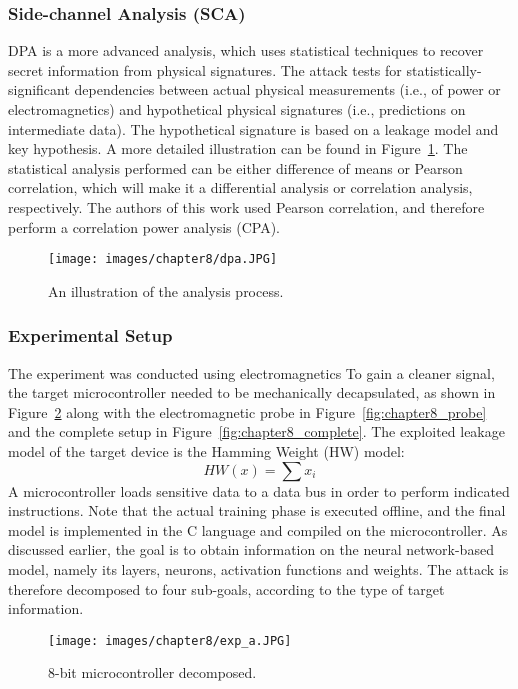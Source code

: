 \subsubsection{Side-channel Analysis (SCA)}
DPA is a more advanced analysis, which uses statistical techniques to recover secret information from physical signatures.
The attack tests for statistically-significant dependencies between actual physical measurements (i.e., of power or electromagnetics) and hypothetical physical signatures (i.e., predictions on intermediate data).
The hypothetical signature is based on a leakage model and key hypothesis. A more detailed illustration can be found in Figure~\ref{fig:chapter8_dpa}.
The statistical analysis performed can be either difference of means or Pearson correlation, which will make it a differential analysis or correlation analysis, respectively.
The authors of this work used Pearson correlation, and therefore perform a correlation power analysis (CPA).

\begin{figure}
    \centering
    \texttt{[image: images/chapter8/dpa.JPG]}
    \caption{An illustration of the analysis process.}
    \label{fig:chapter8_dpa}
\end{figure}

\subsubsection{Experimental Setup}
The experiment was conducted using electromagnetics 
To gain a cleaner signal, the target microcontroller needed to be mechanically decapsulated, as shown in Figure~\ref{fig:chapter8_mc} along with the electromagnetic probe in Figure~\ref{fig:chapter8_probe} and the complete setup in Figure~\ref{fig:chapter8_complete}.
The exploited leakage model of the target device is the Hamming Weight (HW) model:
$$HW(x) = \sum{x_i}$$
A microcontroller loads sensitive data to a data bus in order to perform indicated instructions.
Note that the actual training phase is executed offline, and the final model is implemented in the C language and compiled on the microcontroller.
As discussed earlier, the goal is to obtain information on the neural network-based model, namely its layers, neurons, activation functions and weights.
The attack is therefore decomposed to four sub-goals, according to the type of target information.


\begin{figure}
    \centering
    \texttt{[image: images/chapter8/exp\_a.JPG]}
    \caption{8-bit microcontroller decomposed.}
    \label{fig:chapter8_mc}
\end{figure}

